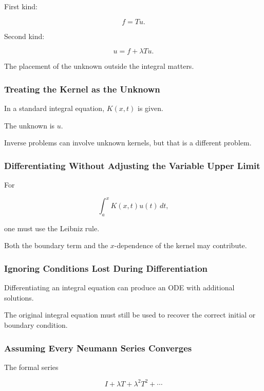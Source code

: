 First kind:

\[
\boxed{
f=Tu.
}
\]

Second kind:

\[
\boxed{
u=f+\lambda Tu.
}
\]

The placement of the unknown outside the integral matters.

\subsubsection{Treating the Kernel as the Unknown}

In a standard integral equation, \(K(x,t)\) is given.

The unknown is \(u\).

Inverse problems can involve unknown kernels, but that is a different
problem.

\subsubsection{Differentiating Without Adjusting the Variable Upper Limit}

For

\[
\int_a^x
K(x,t)u(t)\,dt,
\]

one must use the Leibniz rule.

Both the boundary term and the \(x\)-dependence of the kernel may
contribute.

\subsubsection{Ignoring Conditions Lost During Differentiation}

Differentiating an integral equation can produce an ODE with additional
solutions.

The original integral equation must still be used to recover the correct
initial or boundary condition.

\subsubsection{Assuming Every Neumann Series Converges}

The formal series

\[
I+\lambda T+\lambda^2T^2+\cdots
\]

